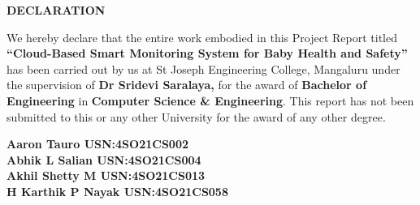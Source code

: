 \documentclass[12pt,a4paper]{report}
\begin{document}
\begin{center}
{\Large \textbf{DECLARATION}}
\end{center}
\justifying
\par
{}
\noindent We hereby declare that the entire work embodied in this Project Report titled
\textbf{``Cloud-Based Smart Monitoring System for Baby Health
and Safety''} has been carried out by us at St Joseph Engineering College, Mangaluru under the supervision of \textbf{Dr Sridevi Saralaya,} for the award of \textbf{Bachelor of Engineering} in \textbf{Computer Science \& Engineering}. This report has not been submitted to this or any other University  for the award of any  other degree. \\
\vspace{0.25in}

\begin{flushleft}
\textbf{Aaron Tauro  USN:4SO21CS002}\\
\vspace{0.1in}
\textbf{Abhik L Salian  USN:4SO21CS004}\\
\vspace{0.1in}
\textbf{Akhil Shetty M  USN:4SO21CS013}\\
\vspace{0.1in}
\textbf{H Karthik P Nayak  USN:4SO21CS058}\\
\end{flushleft}

{}
\end{document}

